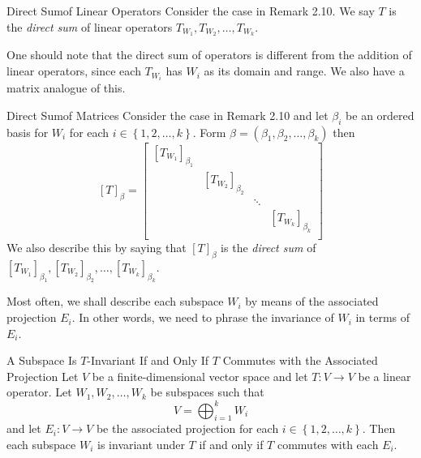 \documentclass[math_245.tex]{subfiles}
\begin{document}
    \begin{definition}{Direct Sum}{of Linear Operators}
        Consider the case in Remark 2.10. We say $T$ is the \emph{direct sum} of linear operators $T_{W_1}, T_{W_2}, \ldots, T_{W_k}$.
    \end{definition}
    
    \begin{remark}
        One should note that the direct sum of operators is different from the addition of linear operators, since each $T_{W_i}$ has $W_i$ as its domain and range. We also have a matrix analogue of this. 
    \end{remark}

    \begin{definition}{Direct Sum}{of Matrices}
        Consider the case in Remark 2.10 and let $\beta_i$ be an ordered basis for $W_i$ for each $i\in \left\lbrace 1, 2, \ldots, k \right\rbrace$. Form $\beta = \left( \beta_1, \beta_2, \ldots, \beta_k \right)$ then
        \begin{equation*}
            \left[ T \right] _\beta =
            \begin{bmatrix}
                \left[ T_{W_1} \right]_{\beta_1} & & & \\
                & \left[ T_{W_2} \right]_{\beta_2} & & \\
                & & \ddots & \\
                & & & \left[ T_{W_k} \right]_{\beta_k} \\
            \end{bmatrix}
        \end{equation*}
        We also describe this by saying that $[T]_\beta$ is the \emph{direct sum} of $[T_{W_1}]_{\beta_1}, [T_{W_2}]_{\beta_2}, \ldots, [T_{W_k}]_{\beta_k}$.
    \end{definition}

    \begin{remark}
        Most often, we shall describe each subspace $W_i$ by means of the associated projection $E_i$. In other words, we need to phrase the invariance of $W_i$ in terms of $E_i$.
    \end{remark}

    \begin{prop}{A Subspace Is $T$-Invariant If and Only If $T$ Commutes with the Associated Projection}
        Let $V$ be a finite-dimensional vector space and let $T:V\to V$ be a linear operator. Let $W_1, W_2, \ldots, W_k$ be subspaces such that
        \begin{equation*}
            V = \bigoplus^{k}_{i=1} W_i
        \end{equation*}
        and let $E_i:V\to V$ be the associated projection for each $i\in \left\lbrace 1, 2, \ldots, k \right\rbrace$. Then each subspace $W_i$ is invariant under $T$ if and only if $T$ commutes with each $E_i$.
    \end{prop}
\end{document}
